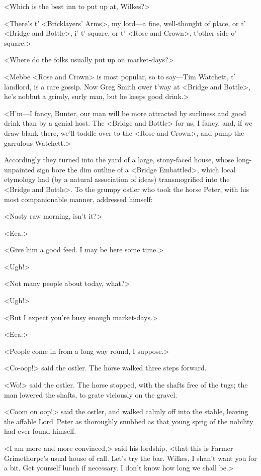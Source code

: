 <Which is the best inn to put up at, Wilkes?>

<There's t' <Bricklayers' Arms>, my lord—a fine, well-thought of place, or t' <Bridge and Bottle>, i' t' square, or t' <Rose and Crown>, t'other side o' square.>

<Where do the folks usually put up on market-days?>

<Mebbe <Rose and Crown> is most popular, so to say—Tim Watchett, t' landlord, is a rare gossip. Now Greg Smith ower t'way at <Bridge and Bottle>, he's nobbut a grimly, surly man, but he keeps good drink.>

<H'm—I fancy, Bunter, our man will be more attracted by surliness and good drink than by a genial host. The <Bridge and Bottle> for us, I fancy, and, if we draw blank there, we'll toddle over to the <Rose and Crown>, and pump the garrulous Watchett.>

Accordingly they turned into the yard of a large, stony-faced house, whose long-unpainted sign bore the dim outline of a <Bridge Embattled>, which local etymology had (by a natural association of ideas) transmogrified into the <Bridge and Bottle>. To the grumpy ostler who took the horse Peter, with his most companionable manner, addressed himself:

<Nasty raw morning, isn't it?>

<Eea.>

<Give him a good feed. I may be here some time.>

<Ugh!>

<Not many people about today, what?>

<Ugh!>

<But I expect you're busy enough market-days.>

<Eea.>

<People come in from a long way round, I suppose.>

<Co-oop!> said the ostler. The horse walked three steps forward.

<Wo!> said the ostler. The horse stopped, with the shafts free of the tugs; the man lowered the shafts, to grate viciously on the gravel.

<Coom on oop!> said the ostler, and walked calmly off into the stable, leaving the affable Lord~Peter as thoroughly snubbed as that young sprig of the nobility had ever found himself.

<I am more and more convinced,> said his lordship, <that this is Farmer Grimethorpe's usual house of call. Let's try the bar. Wilkes, I shan't want you for a bit. Get yourself lunch if necessary. I don't know how long we shall be.>


